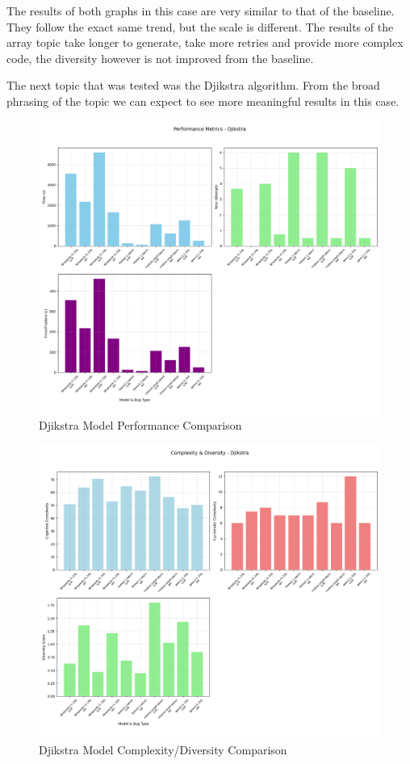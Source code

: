 \documentclass[12pt]{extarticle}
\begin{document}
The results of both graphs in this case are very similar to that of the baseline. They follow the exact same trend, but the scale is different. The results of the array topic take longer to generate, take more retries and provide more complex code, the diversity however is not improved from the baseline.

The next topic that was tested was the Djikstra algorithm. From the broad phrasing of the topic we can expect to see more meaningful results in this case.

\begin{figure}[H]
\centering
\includegraphics[width=0.7\linewidth]{Images/Model_Comparison_Djikstra.png}
\caption{Djikstra Model Performance Comparison}
\label{fig:Model_Comparison_Djikstra}
\end{figure}

\begin{figure}[H]
\centering
\includegraphics[width=0.8\linewidth]{Images/Complexity_Comparison_Djikstra.png}
\caption{Djikstra Model Complexity/Diversity Comparison}
\label{fig:Complexity_Comparison_Djikstra}
\end{figure}
\end{document}
